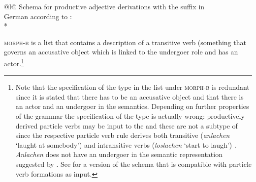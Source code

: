 \documentclass[output=paper]{langsci/langscibook}
\begin{document}
\begin{tabular}[t]{@{}l@{}}
Schema for productive adjective derivations with the suffix  in\\ German according to
\citet[]{Riehemann98a}:\\*
\end{tabular}
\z
\textsc{morph-b} is a list that contains a description of a transitive verb (something that governs
an accusative object which is linked to the undergoer role  and has an actor.\footnote{
  Note that the specification of the type  in the list under \textsc{morph-b} is
  redundant since it is stated that there has to be an accusative object and that there is an actor
  and an undergoer in the semantics. Depending on further properties of the grammar the
  specification of the type is actually wrong: productively derived particle verbs may be input to
  the \bard and these are not a subtype of  since the respective particle verb rule
  derives both transitive (\emph{anlachen} `laught at somebody')  and intransitive verbs
  (\emph{loslachen} `start to laugh') \citep[]{Mueller2003a}. \emph{Anlachen} does not have an
  undergoer in the semantic representation suggested by \citet{Stiebels96a}. See
  \citet[]{Mueller2003a} for a version of the \bard schema that is compatible with particle verb
  formations as input.
}
\end{document}
